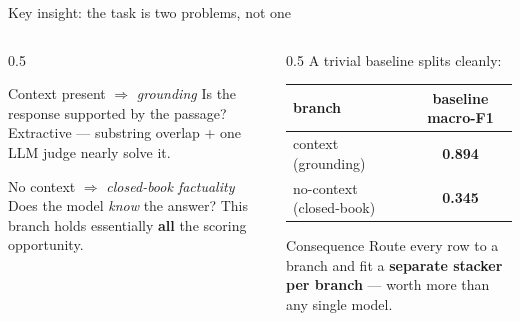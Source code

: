 \documentclass[aspectratio=169,11pt,t]{beamer}
\newcommand{\good}[1]{{\color{good}\bfseries #1}}
\newcommand{\bad}[1]{{\color{bad}\bfseries #1}}
\begin{document}
\begin{frame}{Key insight: the task is two problems, not one}
  \begin{columns}[T]
    \begin{column}{0.5\textwidth}
      \begin{block}{Context present \;$\Rightarrow$\; \emph{grounding}}
        Is the response supported by the passage? Extractive — substring overlap + one LLM judge nearly solve it.
      \end{block}
      \begin{block}{No context \;$\Rightarrow$\; \emph{closed-book factuality}}
        Does the model \emph{know} the answer? This branch holds essentially \textbf{all} the scoring opportunity.
      \end{block}
    \end{column}
    \begin{column}{0.5\textwidth}
      \centering
      A trivial baseline splits cleanly:\\[0.7em]
      \begin{tabular}{lc}
        \toprule
        branch & baseline macro-F1 \\
        \midrule
        context (grounding)     & \good{0.894} \\
        no-context (closed-book)& \bad{0.345} \\
        \bottomrule
      \end{tabular}
      \vspace{0.9em}
      \begin{block}{Consequence}
        Route every row to a branch and fit a \textbf{separate stacker per branch} — worth more than any single model.
      \end{block}
    \end{column}
  \end{columns}
\end{frame}
\end{document}
